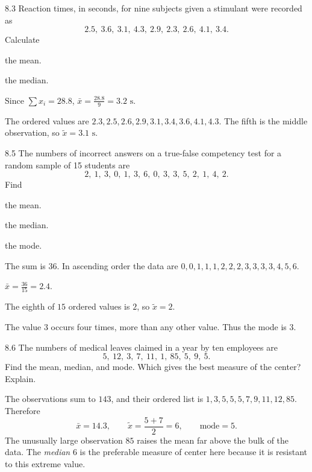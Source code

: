 \documentclass[11pt,oneside]{article}
\begin{document}
\begin{exercise}{8.3}
Reaction times, in seconds, for nine subjects given a stimulant were recorded as
\[
2.5, \ 3.6, \ 3.1, \ 4.3, \ 2.9, \ 2.3, \ 2.6, \ 4.1, \ 3.4.
\]
Calculate
\begin{exercisesubparts}
\item the mean.
\item the median.
\end{exercisesubparts}
\end{exercise}
\begin{solution}
\begin{exercisesubparts}
\item Since $\displaystyle \sum x_i=28.8$, $\displaystyle\bar x=\frac{28.8}{9}=\boxed{3.2\text{ s}}$.
\item The ordered values are $2.3, 2.5, 2.6, 2.9, 3.1, 3.4, 3.6, 4.1, 4.3$. The fifth is the middle observation, so $\boxed{\tilde x=3.1\text{ s}}$.
\end{exercisesubparts}
\end{solution}

\begin{exercise}{8.5}
The numbers of incorrect answers on a true-false competency test for a random sample of 15 students are
\[
2, \ 1, \ 3, \ 0, \ 1, \ 3, \ 6, \ 0, \ 3, \ 3, \ 5, \ 2, \ 1, \ 4, \ 2.
\]
Find
\begin{exercisesubparts}
\item the mean.
\item the median.
\item the mode.
\end{exercisesubparts}
\end{exercise}
\begin{solution}
The sum is $36$. In ascending order the data are $0, 0, 1, 1, 1, 2, 2, 2, 3, 3, 3, 3, 4, 5, 6$.
\begin{exercisesubparts}
\item $\displaystyle\bar x=\frac{36}{15}=\boxed{2.4}$.
\item The eighth of $15$ ordered values is $2$, so $\boxed{\tilde x=2}$.
\item The value $3$ occurs four times, more than any other value. Thus the mode is $\boxed{3}$.
\end{exercisesubparts}
\end{solution}

\begin{exercise}{8.6}
The numbers of medical leaves claimed in a year by ten employees are
\[
5, \ 12, \ 3, \ 7, \ 11, \ 1, \ 85, \ 5, \ 9, \ 5.
\]
Find the mean, median, and mode. Which gives the best measure of the center? Explain.
\end{exercise}
\begin{solution}
The observations sum to $143$, and their ordered list is $1, 3, 5, 5, 5, 7, 9, 11, 12, 85$. Therefore
\[
\bar x=\boxed{14.3}, \qquad
\tilde x=\frac{5+7}{2}=\boxed{6}, \qquad
\text{mode}=\boxed{5}.
\]
The unusually large observation $85$ raises the mean far above the bulk of the data. The \emph{median} $6$ is the preferable measure of center here because it is resistant to this extreme value.
\end{solution}
\end{document}

